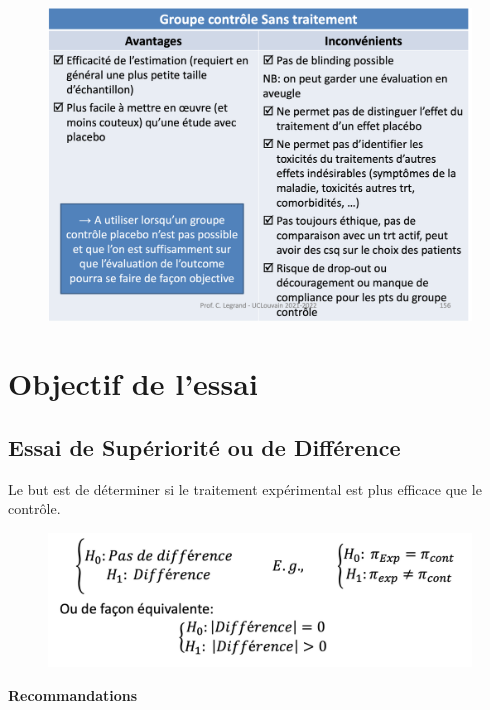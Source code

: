 \begin{figure}[H]
    \centering
    \includegraphics[scale=0.3]{images/no_treatment.png}
    \caption{}
    \label{fig:my_label}
\end{figure}

\section{Objectif de l’essai}

\subsection{Essai de Supériorité ou de Différence}
Le but est de déterminer si le traitement expérimental est plus efficace que le contrôle.

\begin{figure}[H]
    \centering
    \includegraphics[scale=0.5]{images/essais_diff.png}
    \caption{}
    \label{fig:my_label}
\end{figure}

\textbf{Recommandations}\\

